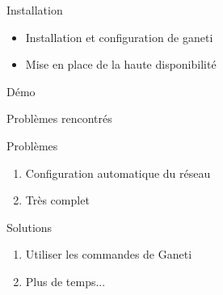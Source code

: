\begin{frame}{Installation}
\begin{itemize}
\item Installation et configuration de ganeti
\pause
\item Mise en place de la haute disponibilité
\end{itemize}
\end{frame}


\begin{frame}
  \begin{center}
   \huge{Démo}
  \end{center}
\end{frame}

\begin{frame}{Problèmes rencontrés}
 \begin{alertblock}{Problèmes}
   \begin{enumerate}
     \item Configuration automatique du réseau
       \pause
     \item Très complet
       \pause
   \end{enumerate}
 \end{alertblock}
\pause
 \begin{exampleblock}{Solutions}
   \begin{enumerate}
     \item Utiliser les commandes de Ganeti
       \pause
     \item Plus de temps...
   \end{enumerate}
 \end{exampleblock}
\end{frame}



%
